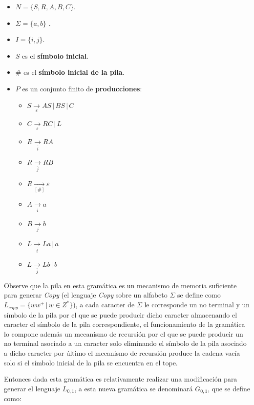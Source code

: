 \documentclass[12pt]{article}
\begin{document}
\begin{itemize}
    \item $N= \{S,R,A,B,C\}$.
    \item \( \Sigma=\{a,b\} \) .
    \item $I=\{i,j\}$.
    \item $S$ es el \textbf{símbolo inicial}.
    \item $\#$ es el \textbf{símbolo inicial de la pila}.
    \item $P$ es un conjunto finito de \textbf{producciones}:
          \begin{multicols}{2}
              \begin{itemize}
                  \item $S\underset{\varepsilon}{\to} AS\,|\,BS\,|\,C$
                  \item $C\underset{\varepsilon}{\to} RC\,|\,L$
                  \item $R\underset{\overline{i}}{\to} RA$
                  \item $R\underset{\overline{j}}{\to} RB$
                  \item $R\underset{[\#]}{\to} \varepsilon$
                  \item $A\underset{i}{\to} a$
                  \item $B\underset{j}{\to} b$
                  \item $L\underset{\overline{i}}{\to} La\,|\,a$
                  \item $L\underset{\overline{j}}{\to} Lb\,|\,b$
              \end{itemize}
          \end{multicols}
\end{itemize}

Observe que la pila en esta gramática es un mecanismo de memoria suficiente para generar \textit{Copy} (el lenguaje \textit{Copy} sobre un alfabeto
$\Sigma$ se define como $L_{copy}=\{ww^+\,|\,w\in Z^*\}$), a cada caracter de $\Sigma$ le corresponde un no terminal y un símbolo de la pila 
por el que se puede producir dicho caracter almacenando el caracter el símbolo de la pila correspondiente, el funcionamiento 
de la gramática lo compone además un mecanismo de recursión por el que se puede producir un no terminal asociado a un caracter
solo eliminando el símbolo de la pila asociado a dicho caracter por último el mecanismo de recursión produce la cadena vacía
solo si el símbolo inicial de la pila se encuentra en el tope.

Entonces dada esta gramática es relativamente realizar una modificación para generar el lenguaje $L_{0,1}$,
a esta nueva gramática se denominará $G_{0,1}$, que se define como:
\end{document}
